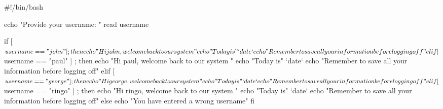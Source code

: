 \begin{exercises}
\begin{source_code}
#!/bin/bash

echo "Provide your username: "
read username

if [ $username == "john" ] ; then
    echo "Hi john, welcome back to our system "
    echo "Today is" `date` 
    echo "Remember to save all your information before logging off"
elif [ $username == "paul" ] ; then
    echo "Hi paul, welcome back to our system "
    echo "Today is" `date`    
    echo "Remember to save all your information before logging off"
elif [ $username == "george" ] ; then
    echo "Hi george, welcome back to our system "
    echo "Today is" `date`    
    echo "Remember to save all your information before logging off"
elif [ $username == "ringo" ] ; then
    echo "Hi ringo, welcome back to our system "
    echo "Today is" `date`    
    echo "Remember to save all your information before logging off"
else
    echo "You have entered a wrong username"
fi
\end{source_code}
\end{exercises}